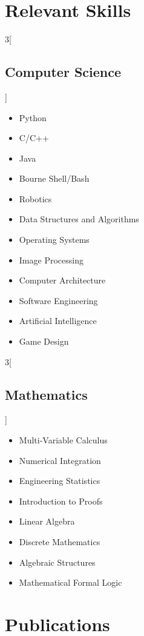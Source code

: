 \documentclass[\ifdefined\cv11pt\else10pt\fi,letterpaper,roman]{moderncv}
\newcommand{\cvonly}[1]{\ifdefined\cv#1\fi}
\newcommand{\deprecated}[1]{}
\begin{document}
\section{Relevant Skills}
\begin{multicols}{3}[\subsection{Computer Science}\vspace*{-1.2\topsep}]
\begin{itemize}
	\item Python
	\item C/C++
	\item Java
	\item Bourne Shell/Bash
	\item Robotics
	\item Data Structures and Algorithms
	\item Operating Systems
	\deprecated{\item Computer Vision}
	\item Image Processing
	\item Computer Architecture
	\item Software Engineering
	\item Artificial Intelligence
	\item Game Design
\end{itemize}
\end{multicols}

\begin{multicols}{3}[\subsection{Mathematics}\vspace*{-1.2\topsep}]
\begin{itemize}
	\item Multi-Variable Calculus
	\cvonly{
		\item Numerical Integration
		\item Engineering Statistics
	}
	\item Introduction to Proofs
	\item Linear Algebra
	\item Discrete Mathematics
	\item Algebraic Structures
	\item Mathematical Formal Logic
\end{itemize}
\end{multicols}

\section{Publications}
	\nocite{*}
	\printbibliography[heading=none]{}
\end{document}
